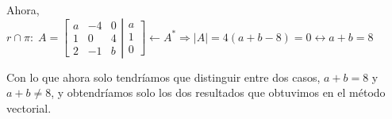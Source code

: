 \begin{proofw}
\noindent Ahora, $r\cap \pi:\; 
A=\left[ \begin{matrix} a&-4&0\\1&0&4\\2&-1&b \end{matrix}\right. \left| \begin{matrix} a\\1\\0 \end{matrix}\right] \leftarrow A^* \Rightarrow |A|=4(a+b-8)=0 \leftrightarrow a+b=8$

\noindent Con lo que ahora solo tendríamos que distinguir entre dos casos, $a+b=8$ y $a+b\neq 8$, y obtendríamos solo los dos resultados que obtuvimos en el método vectorial.

\end{proofw}


